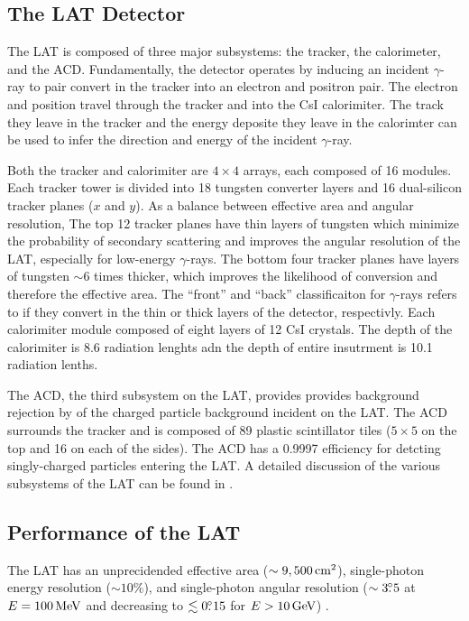 \subsection{The \acs{LAT} Detector}

The \ac{LAT} is composed of three major subsystems: the tracker, the
calorimeter, and the \ac{ACD}. Fundamentally, the detector operates by
inducing an incident $\gamma$-ray to pair convert in the tracker into
an electron and positron pair. The electron and position travel through
the tracker and into the \ac{CsI} calorimiter.  The track they leave in
the tracker and the energy deposite they leave in the calorimter can be
used to infer the direction and energy of the incident $\gamma$-ray.

Both the tracker and calorimiter are $4\times4$ arrays, each composed of
16 modules.  Each tracker tower is divided into 18 tungsten converter
layers and 16 dual-silicon tracker planes ($x$ and $y$).  As a balance
between effective area and angular resolution, The top 12 tracker planes
have thin layers of tungsten which minimize the probability of secondary
scattering and improves the angular resolution of the \ac{LAT}, especially
for low-energy $\gamma$-rays. The bottom four tracker planes have layers
of tungsten $\sim6$ times thicker, which improves the likelihood of
conversion and therefore the effective area.  The ``front'' and ``back''
classificaiton for $\gamma$-rays refers to if they convert in the thin
or thick layers of the detector, respectivly.  Each calorimiter module
composed of eight layers of 12 \ac{CsI} crystals. The depth of the
calorimiter is 8.6 radiation lenghts adn the depth of entire insutrment
is 10.1 radiation lenths.

The \ac{ACD}, the third subsystem on the \ac{LAT}, provides provides
background rejection by of the charged particle background incident
on the \ac{LAT}.  The \ac{ACD} surrounds the tracker and is composed
of 89 plastic scintillator tiles ($5\times5$ on the top and 16
on each of the sides). The \ac{ACD} has a 0.9997 efficiency for
detcting singly-charged particles entering the \ac{LAT}.  A detailed
discussion of the various subsystems of the LAT can be found in
\citep{atwood_2009a_large-telescope}.

\subsection{Performance of the \acs{LAT}}

The \ac{LAT} 
has an unprecidended effective area ($\sim9,500\,\text{cm}^2$),
single-photon energy resolution ($\sim10\%$), and single-photon
angular resolution ($\sim3\mbox{$.\!\!^\circ$}5$ at $E=100\,\text{MeV}$
and decreasing to $\lesssim0\mbox{$.\!\!^\circ$}15$ for $E>10\,\text{GeV}$)
\citep{atwood_2009a_large-telescope}.

